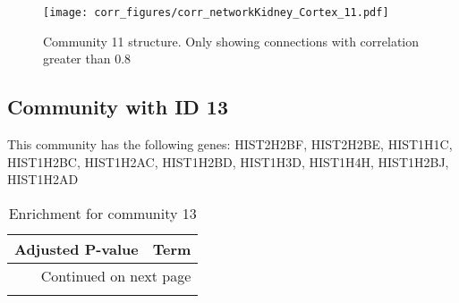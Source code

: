 \begin{figure}[h!]
\centering
\texttt{[image: corr\_figures/corr\_networkKidney\_Cortex\_11.pdf]}
\caption{Community 11 structure. Only showing connections with correlation greater than 0.8}
\end{figure}




\subsection*{Community with ID 13}
This community has the following genes: HIST2H2BF, HIST2H2BE, HIST1H1C, HIST1H2BC, HIST1H2AC, HIST1H2BD, HIST1H3D, HIST1H4H, HIST1H2BJ, HIST1H2AD
\\
\begin{longtable}{p{2.4cm}p{14.5cm}}
\caption{Enrichment for community 13}\\
\toprule
Adjusted \newline P-value &                                                                                                                                  Term \\
\midrule
\endhead
\midrule
\multicolumn{2}{r}{{Continued on next page}} \\
\midrule
\endfoot


\end{longtable}
